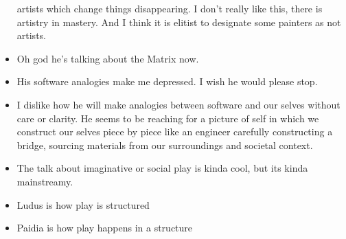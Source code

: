 \documentclass{report}
\begin{document}
\begin{description}
\begin{itemize}
                artists which change things disappearing.
                I don't really like this, there is artistry
                in mastery. And I think it is elitist to designate
                some painters as not artists.
            \item Oh god he's talking about the Matrix now.
            \item His software analogies make me depressed.
                I wish he would please stop.
            \item I dislike how he will make analogies between
                software and our selves without care or
                clarity. He seems to be reaching for a
                picture of self in which we construct our
                selves piece by piece like an engineer
                carefully constructing a bridge, sourcing
                materials from our surroundings and societal
                context.
            \item The talk about imaginative or social
                play is kinda cool, but its kinda
                mainstreamy.
            \item Ludus is how play is structured
            \item Paidia is how play happens in a structure
        \end{itemize}
    \item {\large}
    \item {\large}
\end{description}
\end{document}
